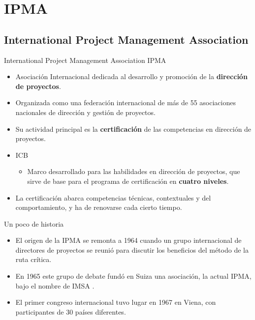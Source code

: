 \section{IPMA}

\subsection{International Project Management Association}
\begin{frame}[allowframebreaks]{International Project Management Association}
	IPMA 
	\begin{itemize}
		\item Asociación Internacional dedicada al desarrollo y promoción de la \textbf{dirección de proyectos}.
		\item Organizada como una federación internacional de más de 55 asociaciones nacionales de dirección y gestión de proyectos.
		\item Su actividad principal es la \textbf{certificación} de las competencias en dirección de proyectos.
		\item ICB 
		\begin{itemize}
				\item Marco desarrollado para las habilidades en dirección de proyectos, que sirve de base para el programa de certificación en \textbf{cuatro niveles}.
		\end{itemize}
		\item La certificación abarca competencias técnicas, contextuales y del comportamiento, y ha de renovarse cada cierto tiempo.
	\end{itemize}
	
	\framebreak
	
	Un poco de historia
	
	\begin{itemize}
		\item El origen de la IPMA se remonta a 1964 cuando un grupo internacional de directores de proyectos se reunió para discutir los beneficios del método de la ruta crítica.
		\item En 1965 este grupo de debate fundó en Suiza una asociación, la actual IPMA, bajo el nombre de IMSA .
		\item El primer congreso internacional tuvo lugar en 1967 en Viena, con participantes de 30 países diferentes.
	\end{itemize}
	

\end{frame}
